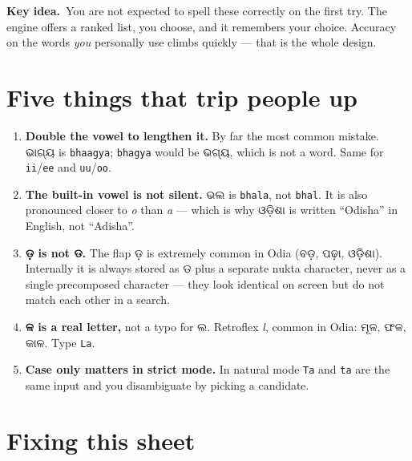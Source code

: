 \documentclass[11pt, a4paper]{article}
\newcommand{\od}[1]{{\odiafont #1}}          %
\newcommand{\kidea}{{\color{midseagreen}\textbf{\textsf{Key idea.}}}\ }
\begin{document}
\begin{keybox}
\kidea You are not expected to spell these correctly on the first try. The engine offers
a ranked list, you choose, and it remembers your choice. Accuracy on the words
\emph{you} personally use climbs quickly --- that is the whole design.
\end{keybox}

\section{Five things that trip people up}

\begin{enumerate}[leftmargin=1.4cm, itemsep=0.45em]
  \item \textbf{Double the vowel to lengthen it.} By far the most common mistake.
        \od{ଭାଗ୍ୟ} is \texttt{bhaagya}; \texttt{bhagya} would be \od{ଭଗ୍ୟ}, which is not a
        word. Same for \texttt{ii}/\texttt{ee} and \texttt{uu}/\texttt{oo}.

  \item \textbf{The built-in vowel is not silent.} \od{ଭଲ} is \texttt{bhala}, not
        \texttt{bhal}. It is also pronounced closer to \emph{o} than \emph{a} --- which is
        why \od{ଓଡ଼ିଶା} is written ``Odisha'' in English, not ``Adisha''.
  \item \textbf{\od{ଡ଼} is not \od{ଡ}.} The flap \od{ଡ଼} is extremely common in Odia
        (\od{ବଡ଼}, \od{ପଢ଼ା}, \od{ଓଡ଼ିଶା}). Internally it is always stored as \od{ଡ} plus a
        separate nukta character, never as a single precomposed character --- they look
        identical on screen but do not match each other in a search.
  \item \textbf{\od{ଳ} is a real letter,} not a typo for \od{ଲ}. Retroflex \emph{l},
        common in Odia: \od{ମୂଳ}, \od{ଫଳ}, \od{କାଳ}. Type \texttt{La}.
  \item \textbf{Case only matters in strict mode.} In natural mode \texttt{Ta} and
        \texttt{ta} are the same input and you disambiguate by picking a candidate.
\end{enumerate}

\section{Fixing this sheet}
\end{document}
